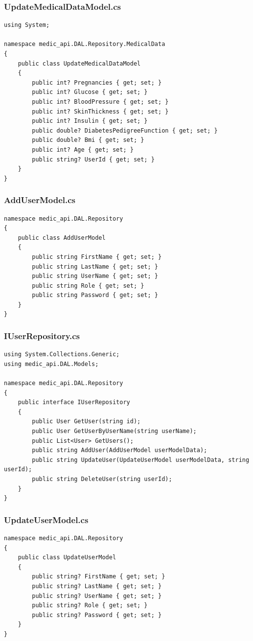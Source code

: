 \documentclass[12pt,a4paper]{article}
\begin{document}
	\subsubsection{UpdateMedicalDataModel.cs}
	\begin{lstlisting}
using System;

namespace medic_api.DAL.Repository.MedicalData
{
    public class UpdateMedicalDataModel
    {
        public int? Pregnancies { get; set; }
        public int? Glucose { get; set; }
        public int? BloodPressure { get; set; }
        public int? SkinThickness { get; set; }
        public int? Insulin { get; set; }
        public double? DiabetesPedigreeFunction { get; set; }
        public double? Bmi { get; set; }
        public int? Age { get; set; }
        public string? UserId { get; set; }
    }
}
	\end{lstlisting}
	\subsubsection{AddUserModel.cs}
	\begin{lstlisting}
namespace medic_api.DAL.Repository
{
    public class AddUserModel
    {
        public string FirstName { get; set; }
        public string LastName { get; set; }
        public string UserName { get; set; }
        public string Role { get; set; }
        public string Password { get; set; }
    }
}
	\end{lstlisting}
	\subsubsection{IUserRepository.cs}
	\begin{lstlisting}
using System.Collections.Generic;
using medic_api.DAL.Models;

namespace medic_api.DAL.Repository
{
    public interface IUserRepository
    {
        public User GetUser(string id);
        public User GetUserByUserName(string userName);
        public List<User> GetUsers();
        public string AddUser(AddUserModel userModelData);
        public string UpdateUser(UpdateUserModel userModelData, string userId);
        public string DeleteUser(string userId);
    }
}
	\end{lstlisting}
	\subsubsection{UpdateUserModel.cs}
	\begin{lstlisting}
namespace medic_api.DAL.Repository
{
    public class UpdateUserModel
    {
        public string? FirstName { get; set; }
        public string? LastName { get; set; }
        public string? UserName { get; set; }
        public string? Role { get; set; }
        public string? Password { get; set; }
    }
}
	\end{lstlisting}
\end{document}
